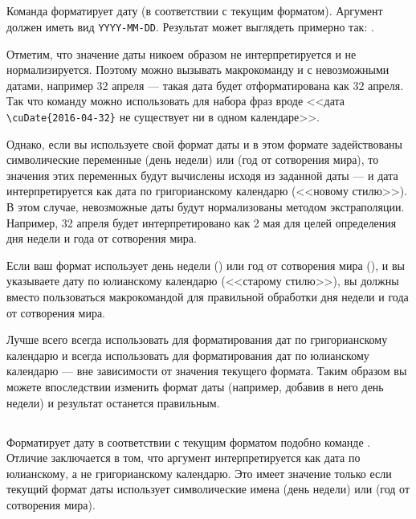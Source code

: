 \begin{RU}

\subsection{}
Команда форматирует дату (в соответствии с текущим форматом). Аргумент должен иметь вид \texttt{YYYY-MM-DD}. Результат
может выглядеть примерно так: .

Отметим, что значение даты никоем образом не интерпретируется и не нормализируется. Поэтому можно вызывать макрокоманду и с
невозможными датами, например 32 апреля --- такая дата будет отформатирована как 32 апреля. Так что команду  можно
использовать для набора фраз вроде <<дата \verb+\cuDate{2016-04-32}+ не существует ни в одном календаре>>.

Однако, если вы используете свой формат даты и в этом формате задействованы символические переменные  (день недели)
или  (год от сотворения мира), то значения этих переменных будут вычислены исходя из заданной даты --- и дата интерпретируется
как дата по григорианскому календарю (<<новому стилю>>). В этом случае, невозможные даты будут нормализованы методом экстраполяции. Например, 32 апреля
будет интерпретировано как 2 мая для целей определения дня недели и года от сотворения мира.

Если ваш формат использует день недели () или год от сотворения мира (), и вы указываете дату по юлианскому календарю (<<старому стилю>>),
вы должны вместо  пользоваться макрокомандой  для правильной обработки дня недели и года от сотворения мира.

Лучше всего всегда использовать  для форматирования дат по григорианскому календарю и всегда использовать  для
форматирования дат по юлианскому календарю --- вне зависимости от значения текущего формата. Таким образом вы можете впоследствии изменить
формат даты (например, добавив в него день недели) и результат останется правильным.

\subsection{}
Форматирует дату в соответствии с текущим форматом подобно команде . Отличие заключается в том, что аргумент
интерпретируется как дата по юлианскому, а не григорианскому календарю. Это имеет значение только если текущий формат даты
использует символические имена  (день недели) или  (год от сотворения мира).
\end{RU}

